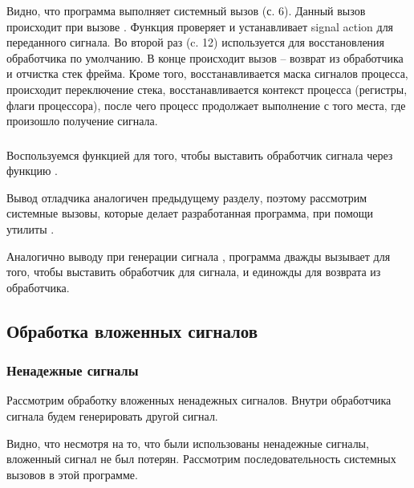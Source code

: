 
Видно, что программа выполняет системный вызов  (с. 6). Данный вызов происходит при вызове . Функция проверяет и устанавливает signal action для переданного сигнала. Во второй раз  (c. 12) используется для восстановления обработчика по умолчанию. В конце происходит вызов  -- возврат из обработчика и отчистка стек фрейма. Кроме того, восстанавливается маска сигналов процесса, происходит переключение стека, восстанавливается контекст процесса (регистры, флаги процессора), после чего процесс продолжает выполнение с того места, где произошло получение сигнала.

\subsubsection{}

Воспользуемся функцией  для того, чтобы выставить обработчик сигнала  через функцию .


Вывод отладчика  аналогичен предыдущему разделу, поэтому рассмотрим системные вызовы, которые делает разработанная программа, при помощи утилиты .


Аналогично выводу  при генерации сигнала , программа дважды вызывает  для того, чтобы выставить обработчик для сигнала, и единожды  для возврата из обработчика.

\subsection{Обработка вложенных сигналов}

\subsubsection{Ненадежные сигналы}

Рассмотрим обработку вложенных ненадежных сигналов. Внутри обработчика сигнала будем генерировать другой сигнал.


Видно, что несмотря на то, что были использованы ненадежные сигналы, вложенный сигнал не был потерян. Рассмотрим последовательность системных вызовов в этой программе.

